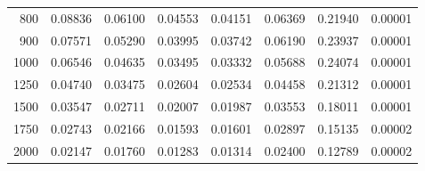 \begin{table}[ht]
\begin{tabular}{r|c|c|c|c|c|c|c}
      800 & 0.08836 & 0.06100 & 0.04553 & 0.04151 & 0.06369 & 0.21940 & 0.00001 \\
      900 & 0.07571 & 0.05290 & 0.03995 & 0.03742 & 0.06190 & 0.23937 & 0.00001 \\
     1000 & 0.06546 & 0.04635 & 0.03495 & 0.03332 & 0.05688 & 0.24074 & 0.00001 \\
     1250 & 0.04740 & 0.03475 & 0.02604 & 0.02534 & 0.04458 & 0.21312 & 0.00001 \\
     1500 & 0.03547 & 0.02711 & 0.02007 & 0.01987 & 0.03553 & 0.18011 & 0.00001 \\
     1750 & 0.02743 & 0.02166 & 0.01593 & 0.01601 & 0.02897 & 0.15135 & 0.00002 \\
     2000 & 0.02147 & 0.01760 & 0.01283 & 0.01314 & 0.02400 & 0.12789 & 0.00002 \\ \cline{1-8}
    \end{tabular}
    \label{tab:XRayEffODE1}
\end{table}

